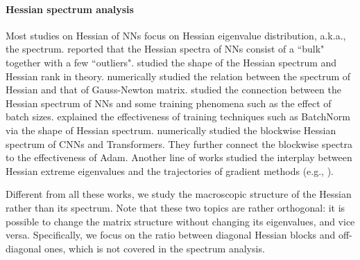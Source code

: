 \documentclass{article}
\newcommand{\1}{^{(1)}}
\newcommand{\2}{^{(2)}}
\begin{document}
\paragraph{Hessian spectrum analysis} Most studies on Hessian of NNs focus on Hessian eigenvalue distribution, a.k.a., the spectrum. \citet{lecun2002efficient,dauphin2014identifying,sagun2016eigenvalues,sagun2017empirical, chaudhari2019entropy,ghorbani2019investigation, granziol2019towards,yao2020pyhessian} reported that the Hessian spectra of NNs consist of a ``bulk" together with a few ``outliers". \citet{pennington2017geometry,fort2019emergent,papyan2020traces,wu2020dissecting,liao2021hessian,singh2021analytic}  studied the shape of the Hessian  spectrum and Hessian rank in theory.  \citet{papyan2018full, papyan2019measurements,sankar2021deeper} numerically studied the relation between the spectrum of Hessian and that of Gauss-Newton matrix.   \citet{keskar2016large,yao2018hessian,zhang2019algorithmic,granziol2022learning} studied the connection between the Hessian spectrum of NNs and some training phenomena such as the effect of batch sizes.   \citet{ghorbani2019investigation, yao2020pyhessian} explained the effectiveness of training techniques such as BatchNorm via the shape of Hessian spectrum. 
\citet{zhang2024transformers} numerically studied the blockwise Hessian spectrum of CNNs and Transformers. They further connect the blockwise spectra to the effectiveness of Adam.  
 Another line of works studied the interplay between  Hessian extreme eigenvalues and  the trajectories of gradient methods (e.g., \citep{wu2017towards,draxler2018essentially,gur2018gradient,jastrzkebski2018relation,chaudhari2019entropy,jiang2019fantastic,he2019asymmetric,alain2019negative,wei2019noise,li2020hessian,jastrzebski2020break,cohen2021gradient,cohen2022adaptive,arora2022understanding,wang2022analyzing,lyu2022understanding,park2022vision}). 

 
 Different from all these works, we study the macroscopic structure of the Hessian rather than its spectrum. Note that these two topics are rather orthogonal: it is possible to change the matrix structure without changing its eigenvalues, and vice versa.
 Specifically, we focus on the ratio between diagonal Hessian blocks and off-diagonal ones, 
 which is not covered in the spectrum analysis. 
\end{document}
